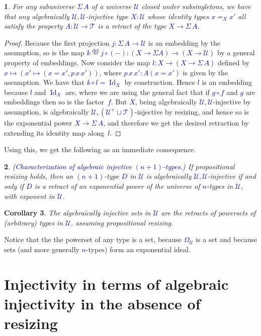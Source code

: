 \documentclass[10pt]{article}
\newcommand{\db}{\textcolor{darkblue}}
\newcommand{\df}[1]{\emph{\db{#1}}}
\newcommand{\m}[1]{\db{$#1$}}
\newcommand{\comp}{\mathrel{\circ}}
\newcommand{\U}{\mathcal{U}}
\newcommand{\T}{\mathcal{T}}
\newcommand{\Id}{\operatorname{Id}}
\newcommand{\eqdef}{\overset{\text{def}}{=}}
\newtheorem{numbered}{}
\newtheorem{corollary}[numbered]{Corollary}
\theoremstyle{definition}
\begin{document}
\begin{numbered}
  For any subuniverse \m{\Sigma \, A} of a universe \m{\U} closed
  under subsingletons, we have that any algebraically
  \m{\U,\U}-injective type \m{X:\U} whose identity types \m{x=_X x'}
  all satisfy the property \m{A:\U \to \T} is a retract of the type
  \m{X \to \Sigma \, A}.
\end{numbered}
\begin{proof}
  Because the first projection \m{j : \Sigma \, A \to \U} is an
  embedding by the assumption, so is the map \m{k \eqdef j \comp (-) :
    (X \to \Sigma A) \to (X \to \U)} by a general property of
  embeddings. Now consider the map \m{l : X \to (X \to \Sigma \, A)}
  defined by \m{x \mapsto (x' \mapsto (x=x', p \, x \, x'))}, where
  \m{p \, x \, x' : A(x=x')} is given by the assumption. We have that
  \m{k \comp l = \Id_X} by construction. Hence \m{l} is an embedding
  because \m{l} and \m{\Id_X} are, where we are using the general fact
  that if \m{g \comp f} and \m{g} are embeddings then so is the
  factor~\m{f}.  But \m{X}, being algebraically \m{\U,\U}-injective by
  assumption, is algebraically \m{\U,(\U^+ \sqcup \T)}-injective by
  resizing, and hence so is the exponential power \m{X \to \Sigma \,
    A}, and therefore we get the desired retraction by extending its
  identity map along~\m{l}.
\end{proof}

Using this, we get the following as an immediate consequence.

\begin{numbered} \df{(Characterization of algebraic injective \m{(n+1)}-types.)}  If propositional resizing holds, then an
  \m{(n+1)}-type \m{D} in \m{\U} is algebraically \m{\U,\U}-injective
  if and only if \m{D} is a retract of an exponential power of the
  universe of \m{n}-types in \m{\U}, with exponent in \m{\U}.
\end{numbered}

\begin{corollary}
  The algebraically injective sets in \m{\U} are the retracts of
  powersets of (arbitrary) types in \m{\U}, assuming propositional resizing.
\end{corollary}
\noindent Notice that the the powerset of any type is a set, because
\m{\Omega_\U} is a set and because sets (and more generally
\m{n}-types) form an exponential ideal.



\section{Injectivity in terms of algebraic injectivity in the absence of resizing}
\end{document}
